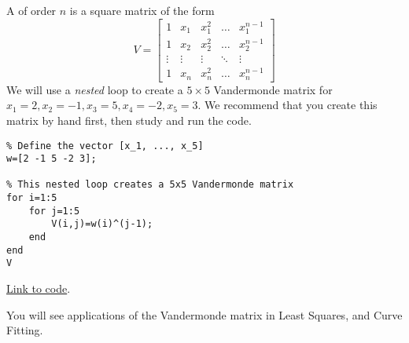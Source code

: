 \documentclass{ximera}
\begin{document}
\begin{example}\label{ex:vandermonde}
    A  of order $n$ is a square matrix of the form 
    $$V=\begin{bmatrix}
1&x_1&x_1^2&\dots&x_1^{n-1}\\
1&x_2&x_2^2&\dots&x_2^{n-1}\\
\vdots&\vdots&\vdots&\ddots&\vdots\\
1&x_n&x_n^2&\dots&x_n^{n-1}\end{bmatrix}$$
We will use a \emph{nested} loop to create a $5\times 5$ Vandermonde matrix for $x_1=2, x_2=-1, x_3=5, x_4=-2, x_5=3$.  We recommend that you create this matrix by hand first, then study and run the code.

\begin{verbatim}
% Define the vector [x_1, ..., x_5]
w=[2 -1 5 -2 3];

% This nested loop creates a 5x5 Vandermonde matrix
for i=1:5
    for j=1:5
        V(i,j)=w(i)^(j-1);
    end
end
V
\end{verbatim}

\href{https://sagecell.sagemath.org/?z=eJxFjEEKgzAURPeB3GE2goIKsWRTcdcjFDdiJeiXRjQpMdQcv7Fd9A08GAYmwY1mbQgKbxq9dejCIHKUZZkjDLLn7Gi6CoWARFHh0tecnUlwf-odhnZPE1ZrXxgdKU97vJJBolVmIrfZaGzKOx04m-O_bsRVcobIWZd_PWlTnS9Zc6Q6e6RLIbL6t5GZOPuq_QBP6C9I&lang=octave&interacts=eJyLjgUAARUAuQ==}{Link to code}.

You will see applications of the Vandermonde matrix in Least Squares, and Curve Fitting.

\end{example}


    
\end{document}
